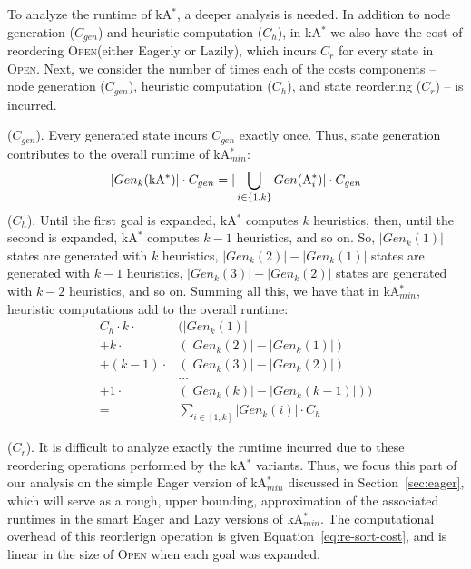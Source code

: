 \documentclass{aicom2e}
\newcommand{\kastar}{kA$^*$}
\newcommand{\kastarmin}{kA$^*_{min}$}
\newcommand{\astari}[1]{A$^*_#1$}
\newcommand{\open}{\textsc{Open}}
\begin{document}
To analyze the runtime of \kastar{}, a deeper analysis is needed. In addition to node generation ($C_{gen}$) and heuristic computation ($C_h$), in \kastar{} we also have the cost of reordering \open (either Eagerly or Lazily), which incurs $C_r$ for every state in \open{}.
Next, we consider the number of
times each of the costs components -- node generation ($C_{gen}$), heuristic computation ($C_h$), and state reordering ($C_r$) -- is incurred.

 ($C_{gen}$). Every generated state incurs
$C_{gen}$ exactly once. Thus, state generation contributes to the overall runtime of \kastarmin{}:
\[ 	
|Gen_k(\text{\kastar{}})|\cdot C_{gen} = 
|\bigcup_{i\in{\{1,k\}}} Gen(\text{\astari{i}})|\cdot C_{gen} 
  \displaystyle
\]
 ($C_{h}$).
Until the first goal is expanded, \kastar{} computes $k$ heuristics,
then, until the second is expanded, \kastar{} computes $k-1$ heuristics, and so on.
So, $|Gen_k(1)|$ states are generated with $k$ heuristics, 
$|Gen_{k}(2)|-|Gen_{k}(1)|$ states are generated with $k-1$ heuristics, 
$|Gen_{k}(3)|-|Gen_{k}(2)|$ states are generated with $k-2$ heuristics, 
and so on. 
Summing all this, we have that in \kastarmin{}, heuristic computations add to the overall runtime:
\begin{align*}
	C_h\cdot k \cdot & (|Gen_k(1)| \\
	 + k \cdot&(|Gen_k(2)|-|Gen_k(1)|)\\
	 + (k-1) \cdot&(|Gen_k(3)|-|Gen_k(2)|) \\
	 &\ldots\\
	 + 1 \cdot&(|Gen_k(k)|-|Gen_k(k-1)|))\\
	 =&\sum_{i\in[1,k]} |Gen_k(i)|\cdot C_h
\end{align*}






\noindent {\bf Reordering of \open{}} ($C_r$).
It is difficult to analyze exactly the runtime incurred due to these reordering operations performed by the \kastar{} variants. 
Thus, we focus this part of our analysis on the simple Eager version of \kastarmin{} discussed in Section~\ref{sec:eager}, which will serve as a rough, upper bounding, approximation of the associated runtimes in the smart Eager and Lazy versions of \kastarmin{}. The computational overhead of this reorderign operation is given Equation~\ref{eq:re-sort-cost}, and 
is linear in the size of \open{} when each goal was expanded. 
\end{document}
